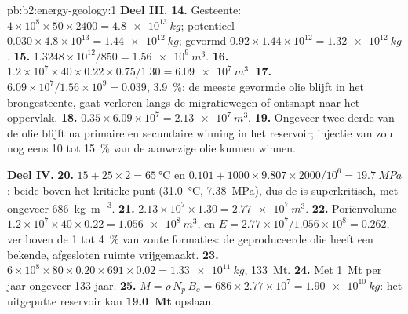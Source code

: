 \begin{solution}{pb:b2:energy-geology:1}
\noindent\textbf{Deel III.}
\textbf{14.} Gesteente: $4 \times 10^8 \times 50 \times 2400 = \qty{4.8e13}{kg}$; potentieel $0.030
\times 4.8 \times 10^{13} = \qty{1.44e12}{kg}$; gevormd $0.92 \times 1.44 \times 10^{12} =
\qty{1.32e12}{kg}$.
\textbf{15.} $1.3248 \times 10^{12}/850 = \qty{1.56e9}{m^3}$.
\textbf{16.} $1.2 \times 10^7 \times 40 \times 0.22 \times 0.75/1.30 = \qty{6.09e7}{m^3}$.
\textbf{17.} $6.09 \times 10^7/1.56 \times 10^9 = 0.039$, \qty{3.9}{\percent}: de meeste gevormde olie
blijft in het brongesteente, gaat verloren langs de migratiewegen of ontsnapt naar het oppervlak.
\textbf{18.} $0.35 \times 6.09 \times 10^7 = \qty{2.13e7}{m^3}$.
\textbf{19.} Ongeveer twee derde van de olie blijft na primaire en secundaire winning in het reservoir;
injectie van  zou nog eens 10 tot \qty{15}{\percent} van de aanwezige olie kunnen winnen.

\noindent\textbf{Deel IV.}
\textbf{20.} $15 + 25 \times 2 = \qty{65}{\celsius}$ en $0.101 + 1000 \times 9.807 \times 2000/10^6
= \qty{19.7}{MPa}$: beide boven het kritieke punt (\qty{31.0}{\celsius}, \qty{7.38}{MPa}), dus de
 is superkritisch, met ongeveer \qty{686}{kg.m^{-3}}.
\textbf{21.} $2.13 \times 10^7 \times 1.30 = \qty{2.77e7}{m^3}$.
\textbf{22.} Poriënvolume $1.2 \times 10^7 \times 40 \times 0.22 = \qty{1.056e8}{m^3}$, en $E =
2.77 \times 10^7/1.056 \times 10^8 = 0.262$, ver boven de 1 tot \qty{4}{\percent} van zoute
formaties: de geproduceerde olie heeft een bekende, afgesloten ruimte vrijgemaakt.
\textbf{23.} $6 \times 10^8 \times 80 \times 0.20 \times 691 \times 0.02 = \qty{1.33e11}{kg}$,
\qty{133}{Mt}.
\textbf{24.} Met \qty{1}{Mt} per jaar ongeveer 133 jaar.
\textbf{25.} $M = \rho\,N_p\,B_o = 686 \times 2.77 \times 10^7 = \qty{1.90e10}{kg}$: het uitgeputte
reservoir kan \textbf{\qty[text-series-to-math=true]{19.0}{Mt}}  opslaan.
\end{solution}
